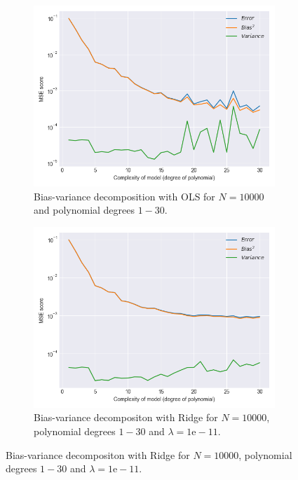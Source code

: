 \documentclass[a4paper,twocolumn]{article}
\begin{document}
\begin{figure}[ht]
    \begin{subfigure}{0.475\columnwidth}
        \centering
        \includegraphics[width=\columnwidth]{bias_variance_tradeoff_OLS_Bootstraps=50_N=10000_Noise=0.0_Degree=1-30.png}
        \caption{Bias-variance decomposition with OLS for $N=10000$ and polynomial degrees $1-30$.}
    \end{subfigure}\hspace{0.1cm}
    \begin{subfigure}{0.475\columnwidth}
        \centering
        \includegraphics[width=\columnwidth]{bias_variance_tradeoff_Ridge_Lambda=1e-11_Bootstraps=50_N=10000_Noise=0.0_Degree=1-30.png}
        \caption{Bias-variance decompositon with Ridge for $N=10000$, polynomial degrees $1-30$ and $\lambda = 1\textrm{e}-11$.}

\end{subfigure}
\end{figure}
\end{document}
